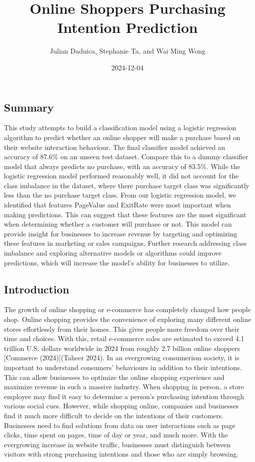 \documentclass[
  letterpaper,
  DIV=11,
  numbers=noendperiod]{scrartcl}
\title{Online Shoppers Purchasing Intention Prediction}
\author{Julian Daduica, Stephanie Ta, and Wai Ming Wong}
\date{2024-12-04}
\renewcommand*\contentsname{Table of contents}
\newcommand\contentsname{Table of contents}
\begin{document}
\maketitle

\renewcommand*\contentsname{Table of contents}
{
\hypersetup{linkcolor=}
\setcounter{tocdepth}{2}
\tableofcontents
}

\subsection{Summary}\label{summary}

This study attempts to build a classification model using a logistic
regression algorithm to predict whether an online shopper will make a
purchase based on their website interaction behaviour. The final
classifier model achieved an accuracy of 87.6\% on an unseen test
dataset. Compare this to a dummy classifier model that always predicts
no purchase, with an accuracy of 83.5\%. While the logistic regression
model performed reasonably well, it did not account for the class
imbalance in the dataset, where there purchase target class was
significantly less than the no purchase target class. From our logistic
regression model, we identified that features PageValue and ExitRate
were most important when making predictions. This can suggest that these
features are the most significant when determining whether a customer
will purchase or not. This model can provide insight for businesses to
increase revenue by targeting and optimizing these features in marketing
or sales campaigns. Further research addressing class imbalance and
exploring alternative models or algorithms could improve predictions,
which will increase the model's ability for businesses to utilize.

\subsection{Introduction}\label{introduction}

The growth of online shopping or e-commerce has completely changed how
people shop. Online shopping provides the convenience of exploring many
different online stores effortlessly from their homes. This gives people
more freedom over their time and choices. With this, retail e-commerce
sales are estimated to exceed 4.1 trillion U.S. dollars worldwide in
2024 from roughly 2.7 billion online shoppers {[}Commerce
(2024){]}(Taheer 2024). In an evergrowing consumerism society, it is
important to understand consumers' behaviours in addition to their
intentions. This can allow businesses to optimize the online shopping
experience and maximize revenue in such a massive industry. When
shopping in person, a store employee may find it easy to determine a
person's purchasing intention through various social cues. However,
while shopping online, companies and businesses find it much more
difficult to decide on the intentions of their customers. Businesses
need to find solutions from data on user interactions such as page
clicks, time spent on pages, time of day or year, and much more. With
the evergrowing increase in website traffic, businesses must distinguish
between visitors with strong purchasing intentions and those who are
simply browsing.
\end{document}
